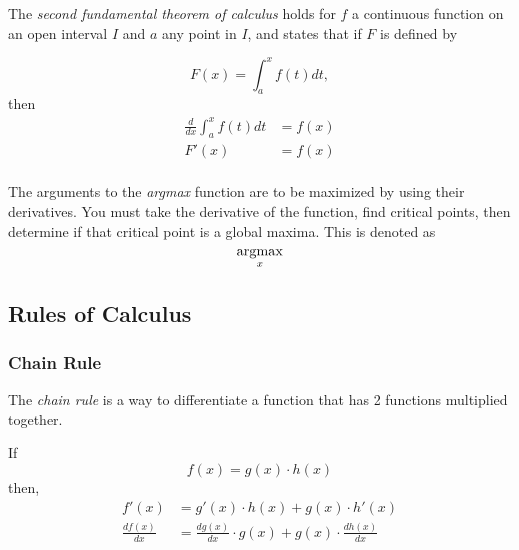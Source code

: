 \begin{definition}\label{def:2nd Fundamental Theorem of Calculus}
  The \emph{second fundamental theorem of calculus} holds for $f$ a continuous function on an open interval $I$ and $a$ any point in $I$, and states that if $F$ is defined by

  \begin{equation*}
    F \left( x \right) = \int_{a}^{x} f \left( t \right) dt,
  \end{equation*}
  then
  \begin{equation}\label{eq:2nd Fundamental Theorem of Calculus}
    \begin{aligned}
      \frac{d}{dx} \int_{a}^{x} f \left( t \right) dt &= f \left( x \right) \\
      F' \left( x \right) &= f \left( x \right) \\
    \end{aligned}
  \end{equation}
\end{definition}

\begin{definition}[argmax]\label{def:argmax}
  The arguments to the \emph{argmax} function are to be maximized by using their derivatives.
  You must take the derivative of the function, find critical points, then determine if that critical point is a global maxima.
  This is denoted as
  \begin{equation*}\label{eq:argmax}
    \operatorname*{argmax}_{x}
  \end{equation*}
\end{definition}

\subsection{Rules of Calculus}\label{subsec:Rules of Calculus}
\subsubsection{Chain Rule}\label{subsubsec:Chain Rule}
\begin{definition}\label{def:Chain Rule}
  The \emph{chain rule} is a way to differentiate a function that has 2 functions multiplied together.

  If
  \begin{equation*}
    f(x) = g(x) \cdot h(x)
  \end{equation*}
  then,
  \begin{equation}\label{eq:Chain Rule}
    \begin{aligned}
      f'(x) &= g'(x) \cdot h(x) + g(x) \cdot h'(x) \\
      \frac{df(x)}{dx} &= \frac{dg(x)}{dx} \cdot g(x) + g(x) \cdot \frac{dh(x)}{dx} \\
    \end{aligned}
  \end{equation}
\end{definition}

